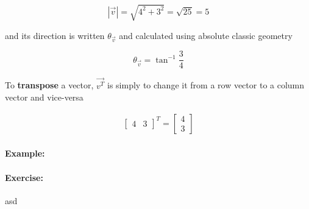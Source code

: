\documentclass{article}
\begin{document}
\[
|\vec{v}| = \sqrt{4^2 + 3^2} = \sqrt{25} = 5
\]

and its direction is written $\theta_{\vec{v}}$ and calculated using absolute classic geometry

\[
\theta_{\vec{v}} = \tan^{-1}\frac{3}{4} 
\]

To \textbf{transpose} a vector, $\vec{v^T}$ is simply to change it from a \color{rooj} row vector \color{black} to a \color{groen} column vector \color{black} and vice-versa

\begin{align*}
\begin{bmatrix} 4 & 3 \end{bmatrix}^T   =  \begin{bmatrix} 4 \\ 3 \end{bmatrix} 
\end{align*}

\paragraph{Example: }

\paragraph{Exercise: } asd
\end{document}
